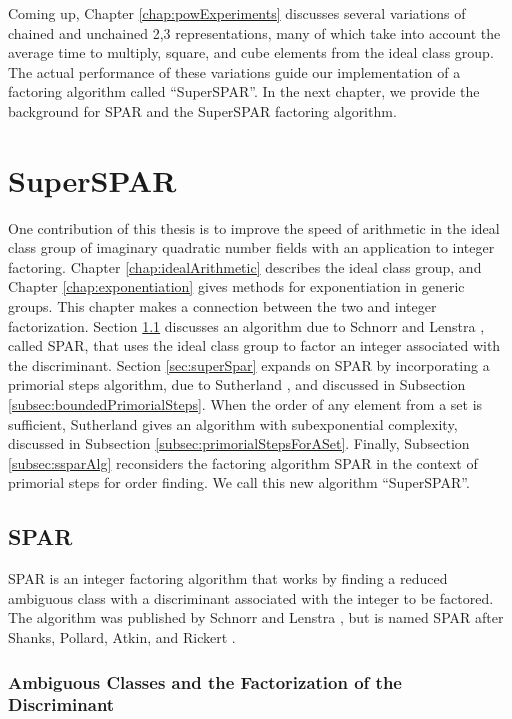 \documentclass{ucalgthes1}
\theoremstyle{definition}
\begin{document}
Coming up, Chapter \ref{chap:powExperiments} discusses several variations of chained and unchained 2,3 representations, many of which take into account the average time to multiply, square, and cube elements from the ideal class group.  The actual performance of these variations guide our implementation of a factoring algorithm called ``SuperSPAR''.  In the next chapter, we provide the background for SPAR and the SuperSPAR factoring algorithm.


\chapter{SuperSPAR}
\label{chap:superspar}

One contribution of this thesis is to improve the speed of arithmetic in the ideal class group of imaginary quadratic number fields with an application to integer factoring.  Chapter \ref{chap:idealArithmetic} describes the ideal class group, and Chapter \ref{chap:exponentiation} gives methods for exponentiation in generic groups.  This chapter makes a connection between the two and integer factorization.  Section \ref{sec:spar} discusses an algorithm due to Schnorr and Lenstra \cite{Schnorr1984}, called SPAR, that uses the ideal class group to factor an integer associated with the discriminant.  Section \ref{sec:superSpar} expands on SPAR by incorporating a primorial steps algorithm, due to Sutherland \cite[\S 4.1]{Sutherland2007}, and discussed in Subsection \ref{subsec:boundedPrimorialSteps}.   When the order of any element from a set is sufficient, Sutherland \cite[\S 5.4]{Sutherland2007} gives an algorithm with subexponential complexity, discussed in Subsection \ref{subsec:primorialStepsForASet}.  Finally, Subsection \ref{subsec:ssparAlg} reconsiders the factoring algorithm SPAR in the context of primorial steps for order finding.  We call this new algorithm ``SuperSPAR''.

\section{SPAR}
\label{sec:spar}

SPAR is an integer factoring algorithm that works by finding a reduced ambiguous class with a discriminant associated with the integer to be factored.  The algorithm was published by Schnorr and Lenstra \cite{Schnorr1984}, but is named SPAR after Shanks, Pollard, Atkin, and Rickert \cite[p.484]{Lenstra1992}.

\subsection{Ambiguous Classes and the Factorization of the Discriminant}
\label{subsec:forms}
\end{document}
